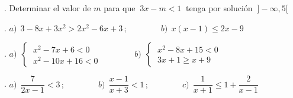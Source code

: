 \begin{mipropuesto}
. Determinar el valor de $m$ para que $\ 3x-m<1\ $ tenga por solución $\ ]-\infty, 5[$
\end{mipropuesto}
\vspace{-8mm}
\begin{flushright}
	\begin{footnotesize} \textcolor{gris}{}	\end{footnotesize}
\end{flushright}

\begin{mipropuesto}
. $a)\ \ 3-8x+3x^2>2x^2-6x+3\, ; \qquad \qquad b)\ \ x(x-1)\leqslant 2x-9$
\end{mipropuesto}
\vspace{-8mm}
\begin{flushright}
	\begin{footnotesize} \textcolor{gris}{\rotatebox{180}{ $a)\ \ ]-\infty, 0[ \ \cup \ ]2,+\infty[;\qquad b)\ \ [-1,9]$}}	\end{footnotesize}
\end{flushright}

\begin{mipropuesto}
. $a)\ \ \begin{cases} \ x^2-7x+6<0 \\ \ x^2-10x+16 < 0 \end{cases} \qquad \qquad b)\ \ \begin{cases} \ x^2-8x+15<0 \\ \ 3x+1\geqslant x+9 \end{cases}$
\end{mipropuesto}
\vspace{-8mm}
\begin{flushright}
	\begin{footnotesize} \textcolor{gris}{\rotatebox{180}{ $a)\ \ ]2,6[\, ; \qquad b)\ \ [4,5[$ }}	\end{footnotesize}
\end{flushright}


\begin{mipropuesto}
. $a)\ \ \dfrac{7}{2x-1}<3 \, ; \qquad \qquad b)\ \ \dfrac{x-1}{x+3} < 1 \, ; \qquad \qquad c)\ \ \dfrac{1}{x+1}\leqslant 1+\dfrac{2}{x-1}$
\end{mipropuesto}
\vspace{-8mm}
\begin{flushright}
	\begin{footnotesize} \textcolor{gris}{\rotatebox{180}{ $a)\ \ ]-\infty, 1/2[ \ \cup \ ]5/3,+\infty[\, ; \qquad b)\ \ ]-\infty,+\infty[ \equiv \mathbb R \, ; \qquad c)\ \ ]-\infty,-1[ \ \cup \ ]1,+\infty[$ }}	\end{footnotesize}
\end{flushright}


